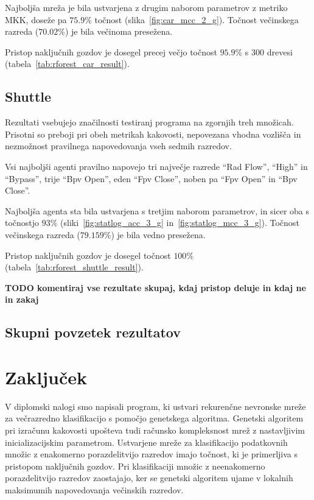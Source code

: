 \documentclass[a4paper,12pt,openright]{book}
\begin{document}
    Najboljša mreža je bila ustvarjena z drugim naborom parametrov z metriko MKK, doseže pa $75.9\%$ točnost (slika~\ref{fig:car_mcc_2_g}).
    Točnost večinskega razreda ($70.02\%$) je bila večinoma presežena.

    Pristop naključnih gozdov je dosegel precej večjo točnost $95.9\%$ s 300 drevesi (tabela~\ref{tab:rforest_car_result}).


    \section{Shuttle}\label{sec:rezultati-shuttle}
    Rezultati vsebujejo značilnosti testiranj programa na zgornjih treh množicah.
    Prisotni so preboji pri obeh metrikah kakovosti, nepovezana vhodna vozlišča in nezmožnost pravilnega napovedovanja vseh sedmih
    razredov.

    Vsi najboljši agenti pravilno napovejo tri največje razrede \enquote{Rad Flow}, \enquote{High} in \enquote{Bypass}, trije
    \enquote{Bpv Open}, eden \enquote{Fpv Close}, noben pa \enquote{Fpv Open} in \enquote{Bpv Close}.

    Najboljša agenta sta bila ustvarjena s tretjim naborom parametrov, in sicer oba s točnostjo $93\%$ (sliki~\ref{fig:statlog_acc_3_g} in~\ref{fig:statlog_mcc_3_g}).
    Točnost večinskega razreda ($79.159\%$) je bila vedno presežena.

    Pristop naključnih gozdov je dosegel točnost $100\%$ (tabela~\ref{tab:rforest_shuttle_result}).
    
    \textbf{TODO komentiraj vse rezultate skupaj, kdaj pristop deluje in kdaj ne in zakaj}

    \section{Skupni povzetek rezultatov}



    \chapter{Zaključek}\label{ch:zakljucki-sklep}
    V diplomski nalogi smo napisali program, ki ustvari rekurenčne nevronske mreže za večrazredno klasifikacijo s pomočjo genetskega algoritma.
    Genetski algoritem pri izračunu kakovosti upošteva tudi računsko kompleksnost mrež z nastavljivim inicializacijskim parametrom.
    Ustvarjene mreže za klasifikacijo podatkovnih množic z enakomerno porazdelitvijo razredov imajo točnost, ki je primerljiva s
    pristopom naključnih gozdov.
    Pri klasifikaciji množic z neenakomerno porazdelitvijo razredov zaostajajo, ker se genetski
    algoritem ujame v lokalnih maksimumih napovedovanja večinskih razredov.
\end{document}
